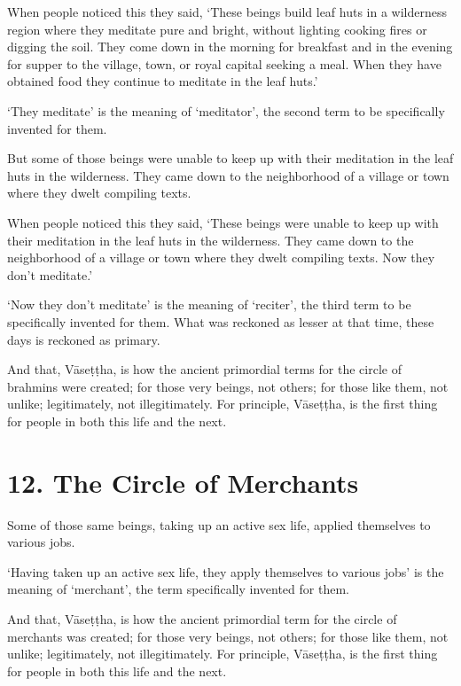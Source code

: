 \documentclass[12pt,openany]{book}%
\begin{document}
When people noticed this they said, ‘These beings build leaf huts in a wilderness region where they meditate pure and bright, without lighting cooking fires or digging the soil. They come down in the morning for breakfast and in the evening for supper to the village, town, or royal capital seeking a meal. When they have obtained food they continue to meditate in the leaf huts.’ 

‘They meditate’ is the meaning of ‘meditator’, the second term to be specifically invented for them. 

But some of those beings were unable to keep up with their meditation in the leaf huts in the wilderness. They came down to the neighborhood of a village or town where they dwelt compiling texts. 

When people noticed this they said, ‘These beings were unable to keep up with their meditation in the leaf huts in the wilderness. They came down to the neighborhood of a village or town where they dwelt compiling texts. Now they don’t meditate.’ 

‘Now they don’t meditate’ is the meaning of ‘reciter’, the third term to be specifically invented for them. What was reckoned as lesser at that time, these days is reckoned as primary. 

And that, \textsanskrit{Vāseṭṭha}, is how the ancient primordial terms for the circle of brahmins were created; for those very beings, not others; for those like them, not unlike; legitimately, not illegitimately. For principle, \textsanskrit{Vāseṭṭha}, is the first thing for people in both this life and the next. 

\section*{12. The Circle of Merchants }

Some of those same beings, taking up an active sex life, applied themselves to various jobs. 

‘Having taken up an active sex life, they apply themselves to various jobs’ is the meaning of ‘merchant’, the term specifically invented for them. 

And that, \textsanskrit{Vāseṭṭha}, is how the ancient primordial term for the circle of merchants was created; for those very beings, not others; for those like them, not unlike; legitimately, not illegitimately. For principle, \textsanskrit{Vāseṭṭha}, is the first thing for people in both this life and the next. 
\end{document}
